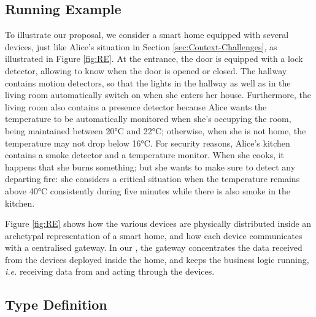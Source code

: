 \subsection{Running Example}
\label{sec:IoTDSL-Example}

To illustrate our proposal, we consider a smart home equipped with several devices, just like Alice's situation in Section \ref{sec:Context-Challenges}, as illustrated in Figure \ref{fig:RE}. At the entrance, the door is equipped with a lock detector, allowing to know when the door is opened or closed. The hallway contains motion detectors, so that the lights in the hallway as well as in the living room automatically switch on when she enters her house. Furthermore, the living room also contains a presence detector because Alice wants the temperature to be automatically monitored when she's occupying the room, being maintained between 20°C and 22°C; otherwise, when she is not home, the temperature may not drop below 16°C. For security reasons, Alice's kitchen contains a smoke detector and a temperature monitor. When she cooks, it happens that she burns something; but she wants to make sure to detect any departing fire: she considers a critical situation when the temperature remains above 40°C consistently during five minutes while there is also smoke in the kitchen. 

Figure \ref{fig:RE} shows how the various devices are physically distributed inside an archetypal representation of a smart home, and how each device communicates with a centralised gateway. In our \DSL, the gateway concentrates the data received from the devices deployed inside the home, and keeps the business logic running, \textit{i.e.} receiving data from and acting through the devices. 

\subsection{Type Definition}
\label{sec:IoTDSL-Type}
 
